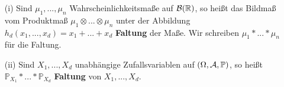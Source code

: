 \begin{deff} \abs

\begin{itemize}
\item[(i)]
	Sind $\mu_1,...,\mu_n$ Wahrscheinlichkeitsmaße auf $\mathcal{B}(\mathbb{R})$, so heißt das Bildmaß vom Produktmaß $\mu_1 \otimes ... \otimes \mu_n$ unter der Abbildung $h_d(x_1,...,x_d) = x_1+...+x_d$ \textbf{Faltung} der Maße. Wir schreiben $\mu_1 *...* \mu_n$ für die Faltung.
\item[(ii)]
	Sind $X_1,...,X_d$ unabhängige Zufallsvariablen auf $(\Omega, \mathcal{A}, \mathbb{P})$, so heißt $\mathbb{P}_{X_1} *...*\mathbb{P}_{X_d}$ \textbf{Faltung} von $X_1, ..., X_d$.
	\end{itemize}
\end{deff}


